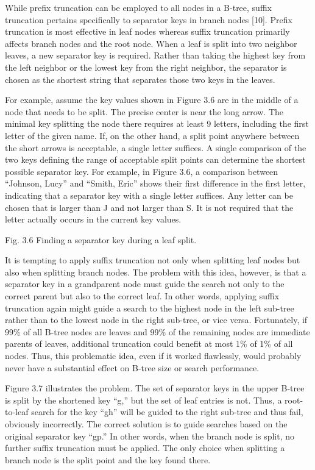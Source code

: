 While prefix truncation can be employed to all nodes in a B-tree, suffix
truncation pertains specifically to separator keys in branch nodes
{[}10{]}. Prefix truncation is most effective in leaf nodes whereas
suffix truncation primarily affects branch nodes and the root node. When
a leaf is split into two neighbor leaves, a new separator key is
required. Rather than taking the highest key from the left neighbor or
the lowest key from the right neighbor, the separator is chosen as the
shortest string that separates those two keys in the leaves.

For example, assume the key values shown in Figure 3.6 are in the middle
of a node that needs to be split. The precise center is near the long
arrow. The minimal key splitting the node there requires at least 9
letters, including the first letter of the given name. If, on the other
hand, a split point anywhere between the short arrows is acceptable, a
single letter suffices. A single comparison of the two keys defining the
range of acceptable split points can determine the shortest possible
separator key. For example, in Figure 3.6, a comparison between
``Johnson, Lucy'' and ``Smith, Eric'' shows their first difference in
the first letter, indicating that a separator key with a single letter
suffices. Any letter can be chosen that is larger than J and not larger
than S. It is not required that the letter actually occurs in the
current key values.

Fig. 3.6 Finding a separator key during a leaf split.

It is tempting to apply suffix truncation not only when splitting leaf
nodes but also when splitting branch nodes. The problem with this idea,
however, is that a separator key in a grandparent node must guide the
search not only to the correct parent but also to the correct leaf. In
other words, applying suffix truncation again might guide a search to
the highest node in the left sub-tree rather than to the lowest node in
the right sub-tree, or vice versa. Fortunately, if 99\% of all B-tree
nodes are leaves and 99\% of the remaining nodes are immediate parents
of leaves, additional truncation could benefit at most 1\% of 1\% of all
nodes. Thus, this problematic idea, even if it worked flawlessly, would
probably never have a substantial effect on B-tree size or search
performance.

Figure 3.7 illustrates the problem. The set of separator keys in the
upper B-tree is split by the shortened key ``g,'' but the set of leaf
entries is not. Thus, a root-to-leaf search for the key ``gh'' will be
guided to the right sub-tree and thus fail, obviously incorrectly. The
correct solution is to guide searches based on the original separator
key ``gp.'' In other words, when the branch node is split, no further
suffix truncation must be applied. The only choice when splitting a
branch node is the split point and the key found there.

